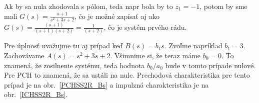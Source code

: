 \documentclass[a4paper, 10pt, ]{article}
\begin{document}
\begin{center}


	\label{PCHSS2R_B}

\end{center}

\begin{center}


	\label{ICHSS2R_B}

\end{center}

Ak by sa nula zhodovala s pólom, teda napr bola by to $z_1 = -1$, potom by sme mali $G(s) =  \frac{s + 1}{s^2 + 3 s + 2}$, čo je možné zapísať aj ako $G(s) =  \frac{(s + 1)}{(s+1)(s+2)} =  \frac{1}{(s+2)}$, čo je systém prvého rádu.

Pre úplnosť uvažujme tu aj prípad keď $B(s) = b_1 s$. Zvoľme napríklad $b_1 = 3$. Zachovávame $A(s) = s^2 + 3 s + 2$. Všimnime si, že teraz máme $b_0 = 0$. To znamená, že zosilnenie systému, teda hodnota $b_0/a_0$ bude v tomto prípade nulové. Pre PCH to znamená, že sa ustáli na nule. Prechodová charakteristika pre tento prípad je na obr.~\ref{PCHSS2R_Bs} a impulzná charakteristika je na obr.~\ref{ICHSS2R_Bs}.

\begin{center}


	\label{PCHSS2R_Bs}

\end{center}

\begin{center}


	\label{ICHSS2R_Bs}

\end{center}
\end{document}
